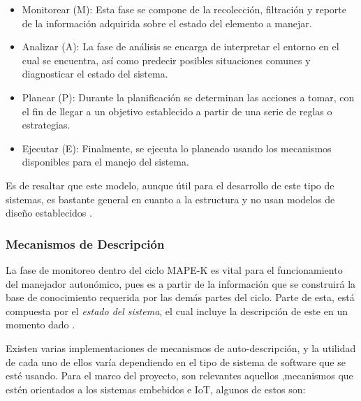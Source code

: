 \begin{itemize}
    \item Monitorear (M): Esta fase se compone de la recolección, filtración y reporte de la información adquirida sobre el estado del elemento a manejar.
    \item Analizar (A): La fase de análisis se encarga de interpretar el entorno en el cual se encuentra, así como predecir posibles situaciones comunes y diagnosticar el estado del sistema.
    \item Planear (P): Durante la planificación se determinan las acciones a tomar, con el fin de llegar a un objetivo establecido a partir de una serie de reglas o estrategias.
    \item Ejecutar (E): Finalmente, se ejecuta lo planeado usando los mecanismos disponibles para el manejo del sistema. 
\end{itemize}

Es de resaltar que este modelo, aunque útil para el desarrollo de este tipo de sistemas, es bastante general en cuanto a la estructura y no usan modelos de diseño establecidos \cite{Ouareth_2018}. 

\subsubsection{Mecanismos de Descripción}


La fase de monitoreo dentro del ciclo MAPE-K es vital para el funcionamiento del manejador autonómico, pues es a partir de la información que se construirá la base de conocimiento requerida por las demás partes del ciclo. Parte de esta, está compuesta por el \textit{estado del sistema}, el cual incluye la descripción de este en un momento dado \cite{Weiss_2011}.

Existen varias implementaciones de mecanismos de auto-descripción, y la utilidad de cada uno de ellos varía dependiendo en el tipo de sistema de software que se esté usando. Para el marco del proyecto, son relevantes aquellos ,mecanismos que estén orientados a los sistemas embebidos e  IoT, algunos de estos son:

